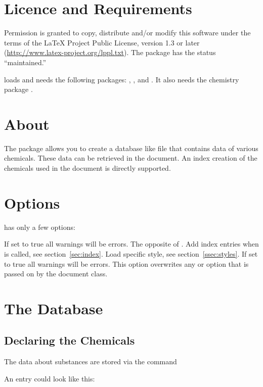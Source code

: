\documentclass[DIV10,toc=index,toc=bib]{cnpkgdoc}
\begin{document}
\section{Licence and Requirements}
Permission is granted to copy, distribute and/or modify this software under the
terms of the \LaTeX{} Project Public License, version 1.3 or later
(\url{http://www.latex-project.org/lppl.txt}). The package has the status
``maintained.''

\substances loads and needs the following packages: ,
,  and . It also needs the
chemistry package .

\section{About}
The \substances package allows you to create a database like file that contains
data of various chemicals. These data can be retrieved in the document. An index
creation of the chemicals used in the document is directly supported.

\section{Options}
\substances has only a few options:
\begin{beschreibung}
   If set to true all warnings will be errors.
   The opposite of .
   Add index entries when  is called, see section~\ref{sec:index}.
   Load specific style, see section~\ref{ssec:styles}.
   If set to true all warnings will be errors. This option overwrites any
    or  option that is passed on by the document class.
\end{beschreibung}

\section{The Database}
\subsection{Declaring the Chemicals}
The data about substances are stored via the command
\begin{beschreibung}
\end{beschreibung}
An entry could look like this:
\begin{beispiel}
\end{beispiel}
\end{document}
